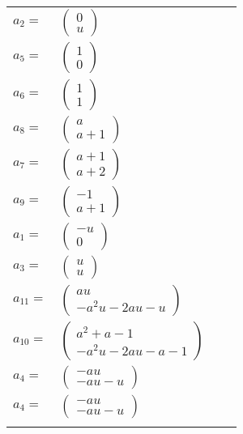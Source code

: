 \documentclass[1p]{elsarticle_modified}
\theoremstyle{definition}
\begin{document}
\begin{tabular}{m{7pt} m{180pt} m{7pt} m{180pt} }
\flushright $a_{2}=$&$\begin{pmatrix}0\\u\end{pmatrix}$ \\
\flushright $a_{5}=$&$\begin{pmatrix}1\\0\end{pmatrix}$ \\
\flushright $a_{6}=$&$\begin{pmatrix}1\\1\end{pmatrix}$ \\
\flushright $a_{8}=$&$\begin{pmatrix}a\\a+1\end{pmatrix}$ \\
\flushright $a_{7}=$&$\begin{pmatrix}a+1\\a+2\end{pmatrix}$ \\
\flushright $a_{9}=$&$\begin{pmatrix}-1\\a+1\end{pmatrix}$ \\
\flushright $a_{1}=$&$\begin{pmatrix}- u\\0\end{pmatrix}$ \\
\flushright $a_{3}=$&$\begin{pmatrix}u\\u\end{pmatrix}$ \\
\flushright $a_{11}=$&$\begin{pmatrix}a u\\- a^2 u-2 a u- u\end{pmatrix}$ \\
\flushright $a_{10}=$&$\begin{pmatrix}a^2+a-1\\- a^2 u-2 a u- a-1\end{pmatrix}$ \\
\flushright $a_{4}=$&$\begin{pmatrix}- a u\\- a u- u\end{pmatrix}$\\ \flushright $a_{4}=$&$\begin{pmatrix}- a u\\- a u- u\end{pmatrix}$\\&\end{tabular}
\end{document}
